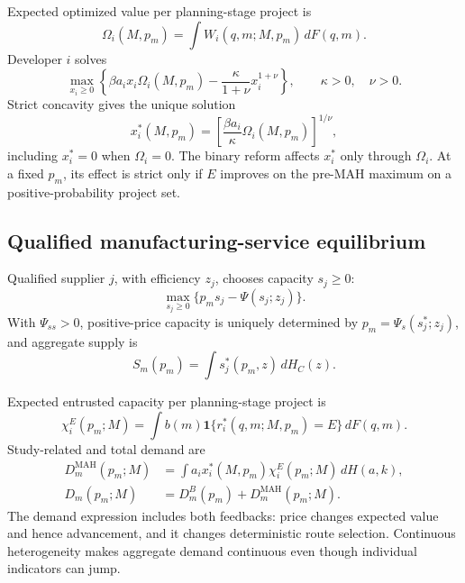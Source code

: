 \documentclass[11pt]{article}
\begin{document}
Expected optimized value per planning-stage project is
\begin{equation}
  \Omega_i(M,p_m)
  =
  \int W_i(q,m;M,p_m)\,dF(q,m).
  \label{eq:p16m-omega}
\end{equation}
Developer \(i\) solves
\begin{equation}
  \max_{x_i\geq0}
  \left\{
  \beta a_ix_i\Omega_i(M,p_m)
  -
  \frac{\kappa}{1+\nu}x_i^{1+\nu}
  \right\},
  \qquad \kappa>0,\quad \nu>0.
  \label{eq:p16m-advancement-problem}
\end{equation}
Strict concavity gives the unique solution
\begin{equation}
  x_i^*(M,p_m)
  =
  \left[
  \frac{\beta a_i}{\kappa}\Omega_i(M,p_m)
  \right]^{1/\nu},
  \label{eq:p16m-advancement}
\end{equation}
including \(x_i^*=0\) when \(\Omega_i=0\). The binary reform affects
\(x_i^*\) only through \(\Omega_i\). At a fixed \(p_m\), its effect is
strict only if \(E\) improves on the pre-MAH maximum on a
positive-probability project set.

\subsection{Qualified manufacturing-service equilibrium}
\label{subsec:p16m-cmo}

Qualified supplier \(j\), with efficiency \(z_j\), chooses capacity
\(s_j\geq0\):
\begin{equation}
  \max_{s_j\geq0}\{p_ms_j-\Psi(s_j;z_j)\}.
  \label{eq:p16m-supplier}
\end{equation}
With \(\Psi_{ss}>0\), positive-price capacity is uniquely determined by
\(p_m=\Psi_s(s_j^*;z_j)\), and aggregate supply is
\[
  S_m(p_m)=\int s_j^*(p_m,z)\,dH_C(z).
\]

Expected entrusted capacity per planning-stage project is
\begin{equation}
  \chi_i^E(p_m;M)
  =
  \int b(m)\mathbf 1\{r_i^*(q,m;M,p_m)=E\}\,dF(q,m).
  \label{eq:p16m-project-demand}
\end{equation}
Study-related and total demand are
\begin{equation}
  \begin{aligned}
  D_m^{\mathrm{MAH}}(p_m;M)
  &=
  \int a_ix_i^*(M,p_m)\chi_i^E(p_m;M)\,dH(a,k),\\
  D_m(p_m;M)
  &=D_m^B(p_m)+D_m^{\mathrm{MAH}}(p_m;M).
  \end{aligned}
  \label{eq:p16m-demand}
\end{equation}
The demand expression includes both feedbacks: price changes expected value
and hence advancement, and it changes deterministic route selection.
Continuous heterogeneity makes aggregate demand continuous even though
individual indicators can jump.
\end{document}
